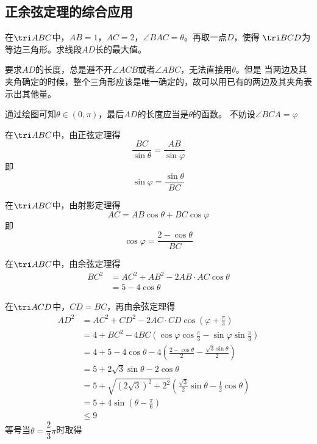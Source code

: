 \subsection{正余弦定理的综合应用}
\begin{example}
    在\(\tri ABC\)中，\(AB=1\)，\(AC=2\)，\(\angle BAC=\theta\)。再取一点\(D\)，使得
    \(\tri BCD\)为等边三角形。求线段\(AD\)长的最大值。
\end{example}
\begin{analyse}
    要求\(AD\)的长度，总是避不开\(\angle ACB\)或者\(\angle ABC\)，无法直接用\(\theta\)。但是
    当两边及其夹角确定的时候，整个三角形应该是唯一确定的，故可以用已有的两边及其夹角表示出其他量。
\end{analyse}
\begin{jie}
    通过绘图可知\(\theta\in(0,\pi)\)，最后\(AD\)的长度应当是\(\theta\)的函数。
    不妨设\(\angle BCA=\varphi\)

    在\(\tri ABC\)中，由正弦定理得\[\frac{BC}{\sin\theta}=\frac{AB}{\sin\varphi}\]
    即\[\sin\varphi=\frac{\sin\theta}{BC}\]

    在\(\tri ABC\)中，由射影定理得\[AC=AB\cos\theta+BC\cos\varphi\]
    即\[\cos\varphi=\frac{2-\cos\theta}{BC}\]

    在\(\tri ABC\)中，由余弦定理得
    \begin{align*}
         BC^2&=AC^2+AB^2-2AB\cdot AC\cos\theta\\
            &=5-4\cos\theta
    \end{align*}
   
    在\(\tri ACD\)中，$CD=BC$，再由余弦定理得
    \begin{align*}
        AD^2&=AC^2+CD^2-2AC\cdot CD\cos(\varphi+\frac{\pi}{3})\\
            &=4+BC^2-4BC(\cos\varphi\cos\frac{\pi}{3}-\sin\varphi\sin\frac{\pi}{3})\\
            &=4+5-4\cos\theta-4(\frac{2-\cos\theta}{2}-\frac{\sqrt{3}\sin\theta}{2})\\
            &=5+2\sqrt{3}\sin\theta-2\cos\theta\\
            &=5+\sqrt{(2\sqrt{3})^2+2^2}(\frac{\sqrt{3}}{2}\sin\theta-\frac{1}{2}\cos\theta)\\
            &=5+4\sin(\theta-\frac{\pi}{6})\\
            &\leq9
    \end{align*}
    等号当\(\theta=\dfrac{2}{3}\pi\)时取得

\end{jie}


